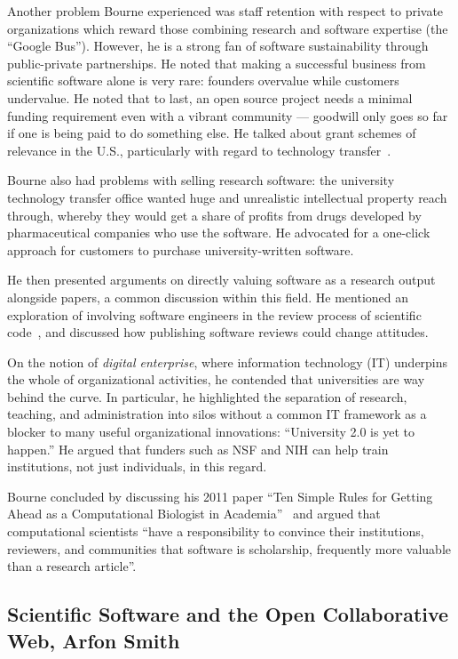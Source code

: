 \documentclass[11pt, oneside]{amsart}
\begin{document}
Another problem Bourne experienced was staff retention with respect to
private organizations which reward those combining research and
software expertise (the ``Google Bus''). However, he is a strong fan
of software sustainability through public-private partnerships. He
noted that making a successful business from scientific software alone
is very rare: founders overvalue while customers undervalue. He noted
that to last, an open source project needs a minimal funding
requirement even with a vibrant community --- goodwill only goes so
far if one is being paid to do something else.  He talked about grant
schemes of relevance in the U.S., particularly with regard to
technology transfer~\cite{sbir-web, fased-web}.

Bourne also had problems with selling research software: the university technology
transfer office wanted huge and unrealistic intellectual property
reach through, whereby they would get a share of profits from drugs
developed by pharmaceutical companies who use the software.
He advocated for  a one-click approach for customers to
purchase university-written software.

He then presented arguments on directly valuing software as
a research output alongside papers, a common discussion within this field.
He mentioned an  exploration of involving software
engineers in the review process of scientific code~\cite{peer-review-code}, and discussed
how publishing software reviews could change attitudes.

On the notion of \emph{digital enterprise}, where information
technology (IT) underpins the whole of organizational activities, he
contended that universities are way behind the curve. In
particular, he highlighted the separation of research, teaching, and
administration into silos without a common IT framework as a blocker
to many useful organizational innovations: ``University 2.0 is yet to
happen.''  He argued that
funders such as NSF and NIH can help train institutions, not just individuals, in this regard.

Bourne concluded by discussing his 2011 paper ``Ten Simple Rules for Getting Ahead as a Computational Biologist in Academia''~\cite{bourne_ten} and
argued that computational scientists ``have a responsibility to
convince their institutions, reviewers, and communities that software is
scholarship, frequently
more valuable than a research article''.

\subsection{Scientific Software and the Open Collaborative Web, Arfon Smith} \label{sec:keynote2}
\end{document}
